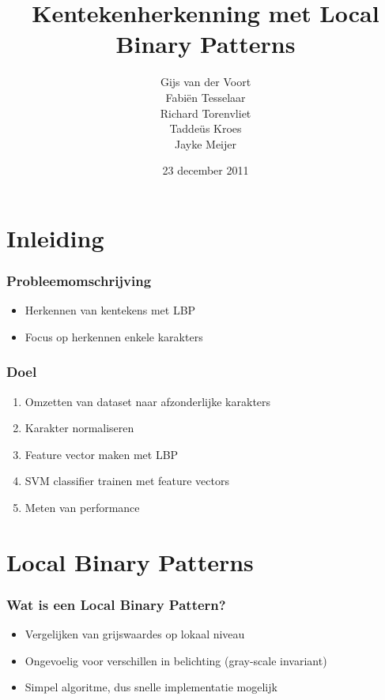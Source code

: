 \documentclass{beamer}
\title{Kentekenherkenning met Local Binary Patterns}
\date{23 december 2011}
\author{
    Gijs van der Voort\\
    Fabi\"en Tesselaar\\
    Richard Torenvliet\\
    Tadde\"us Kroes\\
    Jayke Meijer
}
\begin{document}
    \begin{frame}
        \titlepage
    \end{frame}

    \section{Inleiding}

    \begin{frame}
        \frametitle{Probleemomschrijving}

        \begin{itemize}
            \item Herkennen van kentekens met LBP
            \item Focus op herkennen enkele karakters
        \end{itemize}
    \end{frame}

    \begin{frame}
        \frametitle{Doel}

        \begin{enumerate}
            \item Omzetten van dataset naar afzonderlijke karakters
            \item Karakter normaliseren
            \item Feature vector maken met LBP
            \item SVM classifier trainen met feature vectors
            \item Meten van performance
        \end{enumerate}
    \end{frame}

    \section{Local Binary Patterns}

    \begin{frame}
        \frametitle{Wat is een Local Binary Pattern?}

        \begin{itemize}
            \item Vergelijken van grijswaardes op lokaal niveau
            \item Ongevoelig voor verschillen in belichting (gray-scale
            invariant)
            \item Simpel algoritme, dus snelle implementatie mogelijk
        \end{itemize}
    \end{frame}
\end{document}
